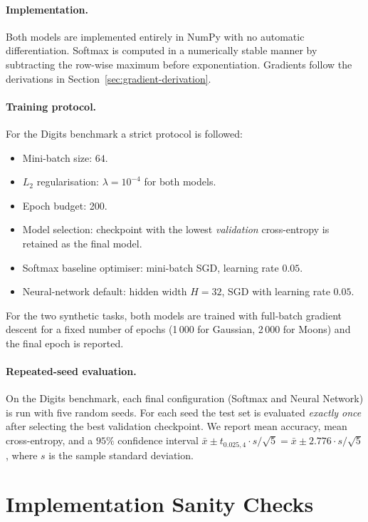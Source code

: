 \documentclass[11pt]{article}
\begin{document}
\paragraph{Implementation.}
Both models are implemented entirely in NumPy with no automatic differentiation.  Softmax is
computed in a numerically stable manner by subtracting the row-wise maximum before
exponentiation.  Gradients follow the derivations in Section~\ref{sec:gradient-derivation}.

\paragraph{Training protocol.}
For the Digits benchmark a strict protocol is followed:
\begin{itemize}[leftmargin=1.4em,itemsep=0.15em]
  \item Mini-batch size: $64$.
  \item $L_2$ regularisation: $\lambda=10^{-4}$ for both models.
  \item Epoch budget: 200.
  \item Model selection: checkpoint with the lowest \emph{validation} cross-entropy
        is retained as the final model.
  \item Softmax baseline optimiser: mini-batch SGD, learning rate $0.05$.
  \item Neural-network default: hidden width $H{=}32$, SGD with learning rate $0.05$.
\end{itemize}

For the two synthetic tasks, both models are trained with full-batch gradient descent for a fixed
number of epochs (1\,000 for Gaussian, 2\,000 for Moons) and the final epoch is reported.

\paragraph{Repeated-seed evaluation.}
On the Digits benchmark, each final configuration (Softmax and Neural Network) is run with five
random seeds.  For each seed the test set is evaluated \emph{exactly once} after selecting the
best validation checkpoint.  We report mean accuracy, mean cross-entropy, and a $95\%$ confidence
interval
\(
  \bar{x}\pm t_{0.025,4}\cdot s/\!\sqrt{5}
  = \bar{x}\pm 2.776\cdot s/\!\sqrt{5}
\),
where $s$ is the sample standard deviation.

\section{Implementation Sanity Checks}
\end{document}
